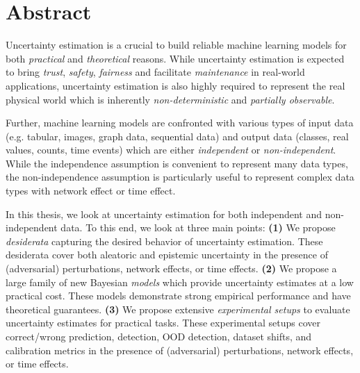 \chapter*{Abstract}
%

Uncertainty estimation is a crucial to build reliable machine learning models for both \emph{practical} and \emph{theoretical} reasons. While uncertainty estimation is expected to bring \emph{trust}, \emph{safety}, \emph{fairness} and facilitate \emph{maintenance} in real-world applications, uncertainty estimation is also highly required to represent the real physical world which is inherently \emph{non-deterministic} and \emph{partially observable}. 

Further, machine learning models are confronted with various types of input data (e.g. tabular, images, graph data, sequential data) and output data (classes, real values, counts, time events) which are either \emph{independent} or \emph{non-independent}. While the independence assumption is convenient to represent many data types, the non-independence assumption is particularly useful to represent complex data types with network effect or time effect.

In this thesis, we look at uncertainty estimation for both independent and non-independent data. To this end, we look at three main points: \textbf{(1)} We propose \emph{desiderata} capturing the desired behavior of uncertainty estimation. These desiderata cover both aleatoric and epistemic uncertainty in the presence of (adversarial) perturbations, network effects, or time effects. \textbf{(2)} We propose a large family of new Bayesian \emph{models} which provide uncertainty estimates at a low practical cost. These models demonstrate strong empirical performance and have theoretical guarantees. \textbf{(3)} We propose extensive \emph{experimental setups} to evaluate uncertainty estimates for practical tasks. These experimental setups cover correct/wrong prediction, detection, OOD detection, dataset shifts, and calibration metrics in the presence of (adversarial) perturbations, network effects, or time effects.
\\
